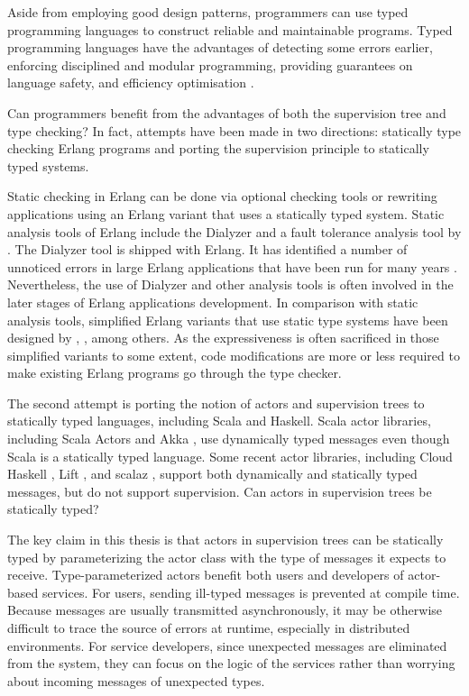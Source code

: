 Aside from employing good design patterns, programmers can use typed 
programming languages to construct reliable and maintainable 
programs.  Typed programming languages have the advantages of detecting some 
errors earlier, enforcing disciplined and modular programming, providing 
guarantees on language safety, and efficiency optimisation \citep{TPL}.

Can programmers benefit from the advantages of both the 
supervision tree and type checking?  In fact, attempts have been made in two 
directions: statically type checking Erlang programs and porting the 
supervision principle to statically typed systems.

Static checking in Erlang can be done via optional checking tools or 
rewriting applications using an Erlang variant that uses a statically typed 
system.  Static analysis tools of Erlang include the Dialyzer \citep{Dialyzer} 
and a fault tolerance analysis tool by \citet{JanHenry}.  The Dialyzer tool is 
shipped with Erlang.  It has identified a number of unnoticed errors in large 
Erlang applications that have been run for many years 
\citep{DialyzerDetecting}. Nevertheless, the use of Dialyzer and other 
analysis tools is often involved in the later stages of Erlang applications 
development.  In comparison with static analysis tools, simplified Erlang 
variants that use static type systems have been designed by 
\citet{marlow1997practical}, \citet{sabelfeld2002securing}, among others.  As 
the expressiveness is often sacrificed in those simplified variants to some 
extent, code modifications are more or less required to make existing 
Erlang programs go through the type checker.

The second attempt is porting the notion of actors and supervision trees to 
statically typed languages, including Scala and Haskell.  Scala actor 
libraries, 
including Scala Actors \citep{actor_1, actor_2} and Akka 
\citep{akka_api,akka_doc}, use 
dynamically typed messages even though Scala is a statically typed language.  
Some recent actor libraries, including Cloud Haskell \citep{CloudHaskell}, Lift 
\citep{lift_scala}, and scalaz \citep{scalaz}, support both 
dynamically and statically typed messages, but do not support supervision.  Can 
actors in supervision trees be statically typed? 

The key claim in this thesis is that actors in supervision trees can be 
statically typed by parameterizing the actor class with the type of messages it 
expects to receive.  Type-parameterized actors benefit both users and developers
of actor-based services. For users, sending ill-typed messages is prevented at 
compile time.  Because messages are usually transmitted asynchronously, it may 
be otherwise difficult to trace the source of errors at runtime, especially in 
distributed environments.  For service developers, since unexpected messages 
are eliminated from the system, they can focus on the logic of the services 
rather than worrying about incoming messages of unexpected types.  

